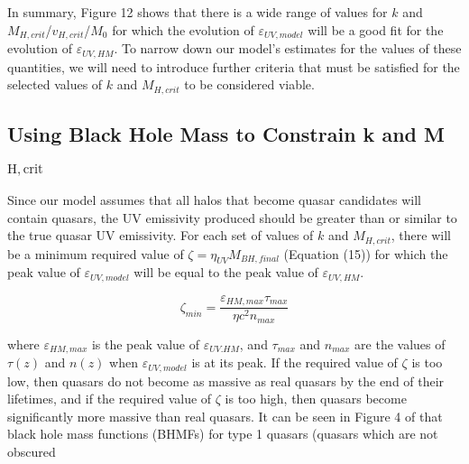 \documentclass[12pt]{article}%
\begin{document}
In summary, Figure 12 shows that there is a wide range of values for $k$ and $M_{H,crit}$/$v_{H,crit}$/$M_0$ for which the evolution of $\varepsilon_{UV,model}$ will be a good fit for the evolution of $\varepsilon_{UV,HM}$. To narrow down our model's estimates for the values of these quantities, we will need to introduce further criteria that must be satisfied for the selected values of $k$ and $M_{H,crit}$ to be considered viable.

\subsection{Using Black Hole Mass to Constrain k and M$_{\mathrm{H,crit}}$}

Since our model assumes that all halos that become quasar candidates will contain quasars, the UV emissivity produced should be greater than or similar to the true quasar UV emissivity. For each set of values of $k$ and $M_{H,crit}$, there will be a minimum required value of $\zeta=\eta_{UV}M_{BH,final}$ (Equation (15)) for which the peak value of $\varepsilon_{UV,model}$ will be equal to the peak value of $\varepsilon_{UV,HM}$.

\begin{equation}
    \zeta_{min}=\frac{\varepsilon_{HM,max}\tau_{max}}{\eta c^2n_{max}}
\end{equation}

\noindent where $\varepsilon_{HM,max}$ is the peak value of $\varepsilon_{UV.HM}$, and $\tau_{max}$ and $n_{max}$ are the values of $\tau(z)$ and $n(z)$ when $\varepsilon_{UV,model}$ is at its peak. If the required value of $\zeta$ is too low, then quasars do not become as massive as real quasars by the end of their lifetimes, and if the required value of $\zeta$ is too high, then quasars become significantly more massive than real quasars. It can be seen in Figure 4 of \cite{BH_mass_fns} that black hole mass functions (BHMFs) for type 1 quasars (quasars which are not obscured

\newpage

\onecolumngrid
\end{document}
